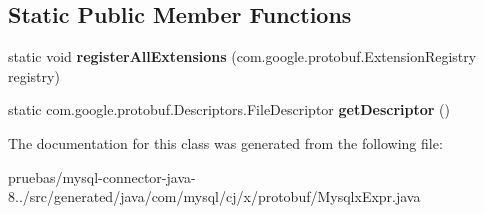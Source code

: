 \subsection*{Static Public Member Functions}
\begin{DoxyCompactItemize}
\item 
\mbox{\label{classcom_1_1mysql_1_1cj_1_1x_1_1protobuf_1_1_mysqlx_expr_ad93727516f637efec3e4d96ff8ef5850}} 
static void {\bfseries register\+All\+Extensions} (com.\+google.\+protobuf.\+Extension\+Registry registry)
\item 
\mbox{\label{classcom_1_1mysql_1_1cj_1_1x_1_1protobuf_1_1_mysqlx_expr_a75a79493b90171a6edd11b4aac33848d}} 
static com.\+google.\+protobuf.\+Descriptors.\+File\+Descriptor {\bfseries get\+Descriptor} ()
\end{DoxyCompactItemize}


The documentation for this class was generated from the following file\+:\begin{DoxyCompactItemize}
\item 
pruebas/mysql-\/connector-\/java-\/8../src/generated/java/com/mysql/cj/x/protobuf/Mysqlx\+Expr.\+java\end{DoxyCompactItemize}
